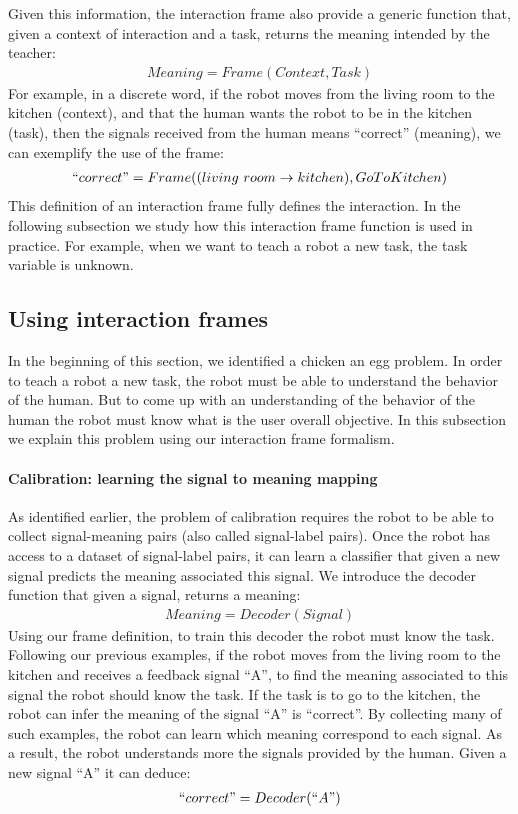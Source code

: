 Given this information, the interaction frame also provide a generic function that, given a context of interaction and a task, returns the meaning intended by the teacher:
%
\begin{eqnarray}
Meaning = Frame(Context, Task) \nonumber
\end{eqnarray}
%
For example, in a discrete word, if the robot moves from the living room to the kitchen (context), and that the human wants the robot to be in the kitchen (task), then the signals received from the human means ``correct'' (meaning), we can exemplify the use of the frame:
%
\begin{eqnarray}
``correct" = Frame((living~room \rightarrow kitchen), Go To Kitchen) \nonumber
\end{eqnarray}
%
This definition of an interaction frame fully defines the interaction. In the following subsection we study how this interaction frame function is used in practice. For example, when we want to teach a robot a new task, the task variable is unknown.

\subsection{Using interaction frames}

In the beginning of this section, we identified a chicken an egg problem. In order to teach a robot a new task, the robot must be able to understand the behavior of the human. But to come up with an understanding of the behavior of the human the robot must know what is the user overall objective. In this subsection we explain this problem using our interaction frame formalism.

\paragraph{Calibration: learning the signal to meaning mapping}

As identified earlier, the problem of calibration requires the robot to be able to collect signal-meaning pairs (also called signal-label pairs). Once the robot has access to a dataset of signal-label pairs, it can learn a classifier that given a new signal predicts the meaning associated this signal. We introduce the decoder function that given a signal, returns a meaning:
%
\begin{eqnarray}
    Meaning = Decoder(Signal) \nonumber
\end{eqnarray}
%
Using our frame definition, to train this decoder the robot must know the task. Following our previous examples, if the robot moves from the living room to the kitchen and receives a feedback signal ``A'', to find the meaning associated to this signal the robot should know the task. If the task is to go to the kitchen, the robot can infer the meaning of the signal ``A'' is ``correct''. By collecting many of such examples, the robot can learn which meaning correspond to each signal. As a result, the robot understands more the signals provided by the human. Given a new signal ``A'' it can deduce:
%
\begin{eqnarray}
    ``correct" = Decoder(``A") \nonumber
\end{eqnarray}

